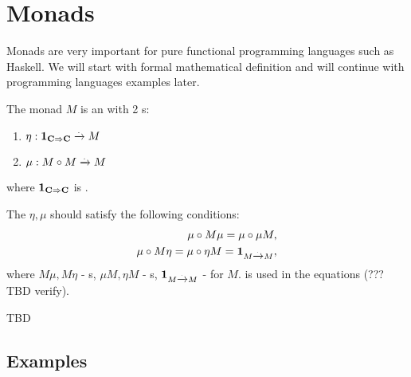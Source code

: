 \chapter{Monads}

Monads are very important for pure functional programming languages
such as Haskell. We will start with formal mathematical definition and
will continue with programming languages examples later.

\begin{definition}[Monad]
  \label{def:monad}
  The monad $M$ is an  with 2
  s:
  \begin{enumerate}
  \item $\eta: \mathbf{1}_{ \mathbf{C} \Rightarrow \mathbf{C} } \xrightarrow{.} M$
  \item $\mu: M \circ M \xrightarrow{.} M$
  \end{enumerate}
  where $\mathbf{1}_{ \mathbf{C} \Rightarrow \mathbf{C} }$ is .

  The $\eta, \mu$ should satisfy the following conditions:
  \begin{eqnarray}
    \mu \circ M \mu = \mu \circ \mu M, 
    \nonumber \\
    \mu \circ M \eta = \mu \circ \eta M = \mathbf{1}_{ M \xrightarrow{.} M },
    \nonumber
  \end{eqnarray}
  where $M \mu, M \eta$ - s, $\mu M, \eta M$ -
  s, $\mathbf{1}_{ M \xrightarrow{.} M }$ -  for $M$.
   is used in the equations
  (???TBD verify).
\end{definition}




TBD

\section{Examples}

